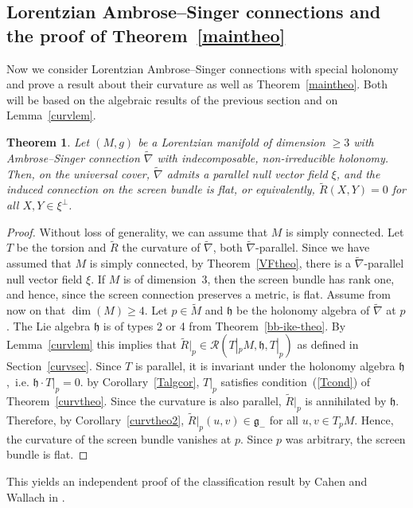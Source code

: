 \documentclass[11pt,a4paper]{amsart}
\newcommand{\tM}{\widetilde{M}}
\newcommand{\tnab}{\widetilde{\nabla}}
\newcommand{\tR}{\widetilde{R}}
\newcommand{\g}{\mathfrak{g}}
\newcommand{\h}{\mathfrak{h}}
\newcommand{\+}{\oplus}
\newcommand{\1}{\mathbf{1}}
\newcommand{\<}{\langle}
\renewcommand{\>}{\rangle}
\theoremstyle{definition}
\theoremstyle{plain}
\newtheorem{theorem}[definition]{Theorem}
\numberwithin{equation}{section}
\begin{document}
\subsection{Lorentzian Ambrose--Singer connections and the proof of Theorem~\ref{maintheo}}\label{LASsec}
Now we consider Lorentzian Ambrose--Singer connections with special holonomy and prove a result about their curvature as well as Theorem~\ref{maintheo}. Both will be based on the algebraic results of the previous section and on Lemma~\ref{curvlem}.
\begin{theorem}\label{ASflattheo}
Let $(M,g)$ be a Lorentzian manifold of dimension $\ge 3$ with Ambrose--Singer connection $\tnab$ with indecomposable, non-irreducible holonomy. Then, on the universal cover,  $\tnab$ admits a parallel null vector field $\xi$, and the induced connection on the screen bundle is flat, or equivalently, $\tR(X,Y)=0$ for all $X,Y\in \xi^\perp$.
\end{theorem}
\begin{proof}
Without loss of generality, we can assume that $M$ is simply connected.
Let $T$ be the torsion and $\tR$ the curvature of $\tnab$, both $\tnab$-parallel.  
Since we have assumed that $M$ is simply connected, by Theorem~\ref{VFtheo}, there is  a  $\tnab$-parallel null vector field $\xi$.
If $M$ is of dimension~$3$, then the screen bundle has rank one, and hence, since the screen connection preserves a metric, is flat. Assume from now on that $\dim(M)\ge 4$.
Let $p\in \tM$ and   $\h$ be the holonomy algebra of $\tnab$ at $p$. The Lie algebra $\h$ is of types 2 or 4 from Theorem~\ref{bb-ike-theo}.
By Lemma~\ref{curvlem} this implies that $\tR|_p\in \mathcal R(T|_pM,\h, T|_p)$ as defined in Section~\ref{curvsec}.
Since $T$ is parallel, it is invariant under  the holonomy algebra $\h$,~i.e. $\h\cdot T|_p=0$.
by Corollary~\ref{Talgcor}, $T|_p$ satisfies condition~(\ref{Tcond}) of Theorem~\ref{curvtheo}. Since the curvature is also parallel, $\tR|_p$ is annihilated by $\h$. Therefore, by Corollary~\ref{curvtheo2}, $\tR|_p(u,v)\in \g_-$ for all $u,v\in T_pM$. Hence, the curvature of the screen bundle vanishes at $p$. Since $p$ was arbitrary, the screen bundle  is flat.  
\end{proof}

This  yields an independent proof of the classification result by Cahen and Wallach in \cite{cahen-wallach70}.
\end{document}
